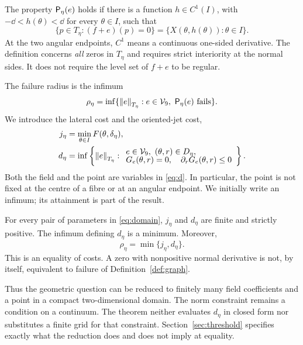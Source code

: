 \documentclass[11pt,a4paper]{article}
\begin{document}
\begin{definition}\label{def:graph}
The property $\mathsf P_\eta(e)$ holds if there is a function
$h\in C^1(I)$, with $-\dd<h(\theta)<\dd$ for every $\theta\in I$,
such that
\begin{equation}\label{eq:graph}
 \{p\in T_\eta:(f+e)(p)=0\}
 =\{X(\theta,h(\theta)):\theta\in I\}.
\end{equation}
At the two angular endpoints, $C^1$ means a continuous one-sided
derivative. The definition concerns \emph{all} zeros in $T_\eta$ and
requires strict interiority at the normal sides. It does not require the
level set of $f+e$ to be regular.
\end{definition}

The failure radius is the infimum
\begin{equation}\label{eq:rho}
 \rho_\eta=\inf\{\left\lVert e\right\rVert_{T_\eta}:e\in\mathcal V_9,\ \mathsf P_\eta(e)\text{ fails}\}.
\end{equation}
We introduce the lateral cost and the oriented-jet cost,
\begin{align}
 j_\eta&=\min_{\theta\in I}F(\theta,\delta_\eta),\label{eq:j}\\
 d_\eta&=\inf\left\{\left\lVert e\right\rVert_{T_\eta}:
   \begin{array}{l}
    e\in\mathcal V_9,\ (\theta,r)\in D_\eta,\\[-2pt]
    G_e(\theta,r)=0,\quad \partial_rG_e(\theta,r)\le0
   \end{array}\right\}.\label{eq:d}
\end{align}
Both the field and the point are variables in \eqref{eq:d}. In
particular, the point is not fixed at the centre of a fibre or at an
angular endpoint. We initially write an infimum; its attainment is part
of the result.

\begin{theorem}\label{thm:main}
For every pair of parameters in \eqref{eq:domain}, $j_\eta$ and $d_\eta$
are finite and strictly positive. The infimum defining $d_\eta$ is a
minimum. Moreover,
\begin{equation}\label{eq:main}
 \boxed{\rho_\eta=\min\{j_\eta,d_\eta\}.}
\end{equation}
This is an equality of costs. A zero with nonpositive normal derivative
is not, by itself, equivalent to failure of Definition~\ref{def:graph}.
\end{theorem}

Thus the geometric question can be reduced to finitely many field
coefficients and a point in a compact two-dimensional domain. The norm
constraint remains a condition on a continuum. The theorem neither
evaluates $d_\eta$ in closed form nor substitutes a finite grid for that
constraint. Section~\ref{sec:threshold} specifies exactly what the
reduction does and does not imply at equality.
\end{document}
